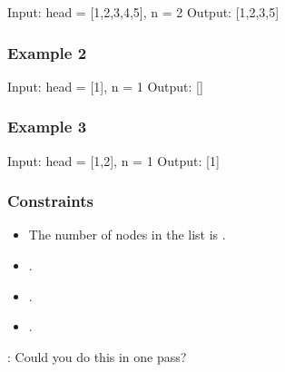 \documentclass[letterpaper,12pt,english]{book}
\begin{document}
\begin{sphinxVerbatim}[commandchars=\\\{\}]
Input: head = [1,2,3,4,5], n = 2
Output: [1,2,3,5]
\end{sphinxVerbatim}


\subsubsection{Example 2}
\label{\detokenize{Two_Pointers/08_TP_19_Remove_Nth_Node_From_End_of_List:example-2}}
\begin{sphinxVerbatim}[commandchars=\\\{\}]
Input: head = [1], n = 1
Output: []
\end{sphinxVerbatim}


\subsubsection{Example 3}
\label{\detokenize{Two_Pointers/08_TP_19_Remove_Nth_Node_From_End_of_List:example-3}}
\begin{sphinxVerbatim}[commandchars=\\\{\}]
Input: head = [1,2], n = 1
Output: [1]
\end{sphinxVerbatim}


\subsubsection{Constraints}
\label{\detokenize{Two_Pointers/08_TP_19_Remove_Nth_Node_From_End_of_List:constraints}}\begin{itemize}
\item {} 
\sphinxAtStartPar
The number of nodes in the list is .

\item {} 
\sphinxAtStartPar
{}.

\item {} 
\sphinxAtStartPar
{}.

\item {} 
\sphinxAtStartPar
{}.

\end{itemize}

\sphinxAtStartPar
{}: Could you do this in one pass?
\end{document}
